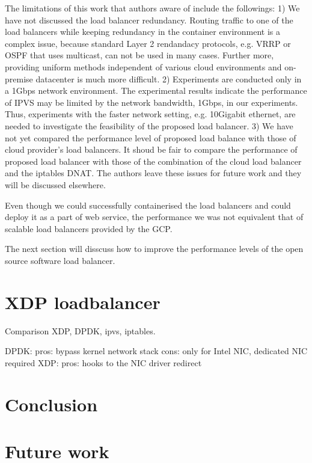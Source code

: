 The limitations of this work that authors aware of include the followings: 
1) We have not discussed the load balancer redundancy. 
Routing traffic to one of the load balancers while keeping redundancy in the container environment is a complex issue,
because standard Layer 2 rendandacy protocols, e.g. VRRP or OSPF\cite{moy1997ospf} that uses multicast, can not be used in many cases.
Further more, providing uniform methods independent of various cloud environments and on-premise datacenter is much more difficult.   
2) Experiments are conducted only in a 1Gbps network environment.
The experimental results indicate the performance of IPVS may be limited by the network bandwidth, 1Gbps, in our experiments. 
Thus, experiments with the faster network setting, e.g. 10Gigabit ethernet, are needed to investigate the feasibility of the proposed load balancer.
3) We have not yet compared the performance level of proposed load balance with those of cloud provider's load balancers.
It shoud be fair to compare the performance of proposed load balancer with those of the combination of the cloud load balancer and the iptables DNAT. 
The authors leave these issues for future work and they will be discussed elsewhere.


Even though we could successfully containerised the load balancers and could deploy it as a part of web service, the performance we was not equivalent that of scalable load balancers provided by the GCP.

The next section will disscuss how to improve the performance levels of the open source software load balancer. 

\section{XDP loadbalancer}\label{XDP loadbalancer}

Comparison XDP, DPDK, ipvs, iptables.

DPDK: pros: bypass kernel network stack cons: only for Intel NIC, dedicated NIC required
XDP: pros: hooks to the NIC driver redirect 

\section{Conclusion}\label{XDP loadbalancer}

\section{Future work}\label{XDP loadbalancer}




